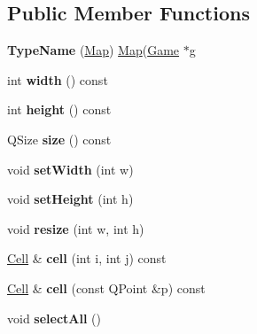 \subsection*{\-Public \-Member \-Functions}
\begin{DoxyCompactItemize}
\item 
\hypertarget{class_map_abb18ba5d4ffce18e1813b77b7f6266c9}{{\bfseries \-Type\-Name} (\hyperlink{class_map}{\-Map}) \hyperlink{class_map}{\-Map}(\hyperlink{class_game}{\-Game} $\ast$g}\label{class_map_abb18ba5d4ffce18e1813b77b7f6266c9}

\item 
\hypertarget{class_map_a4c35169a60acd3669f198e6c2d20dff5}{int {\bfseries width} () const }\label{class_map_a4c35169a60acd3669f198e6c2d20dff5}

\item 
\hypertarget{class_map_a009f197c2e488d8dd5f02b1a2920a15c}{int {\bfseries height} () const }\label{class_map_a009f197c2e488d8dd5f02b1a2920a15c}

\item 
\hypertarget{class_map_a028c347d88716e984c943f382f58b7ef}{\-Q\-Size {\bfseries size} () const }\label{class_map_a028c347d88716e984c943f382f58b7ef}

\item 
\hypertarget{class_map_a2915ccde4d8a2ba8142677baea803467}{void {\bfseries set\-Width} (int w)}\label{class_map_a2915ccde4d8a2ba8142677baea803467}

\item 
\hypertarget{class_map_affab3537641a7985559f83ea083e00ca}{void {\bfseries set\-Height} (int h)}\label{class_map_affab3537641a7985559f83ea083e00ca}

\item 
\hypertarget{class_map_a5f7c31af6620d00ce8a812c8710345ab}{void {\bfseries resize} (int w, int h)}\label{class_map_a5f7c31af6620d00ce8a812c8710345ab}

\item 
\hypertarget{class_map_a6c94b3e99490efa0f170db132dc9f5b8}{\hyperlink{class_cell}{\-Cell} \& {\bfseries cell} (int i, int j) const }\label{class_map_a6c94b3e99490efa0f170db132dc9f5b8}

\item 
\hypertarget{class_map_ae0b03b422a10edbfa7bd0b4bdd085793}{\hyperlink{class_cell}{\-Cell} \& {\bfseries cell} (const \-Q\-Point \&p) const }\label{class_map_ae0b03b422a10edbfa7bd0b4bdd085793}

\item 
\hypertarget{class_map_a16aea6b5c9de3a26b094d964885b33b7}{void {\bfseries select\-All} ()}\label{class_map_a16aea6b5c9de3a26b094d964885b33b7}


\end{DoxyCompactItemize}

